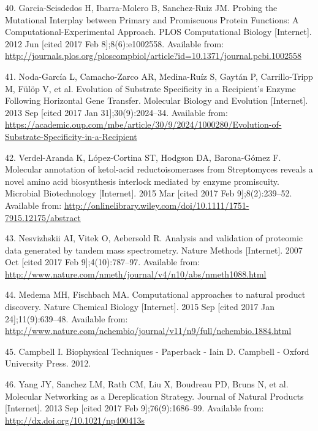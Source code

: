 \documentclass[12pt,twoside]{reedthesis}
\begin{document}
{  \hypertarget{ref-garcia-seisdedos_probing_2012}{}
  40. Garcia-Seisdedos H, Ibarra-Molero B, Sanchez-Ruiz JM. Probing the
  Mutational Interplay between Primary and Promiscuous Protein Functions:
  A Computational-Experimental Approach. PLOS Computational Biology
  {[}Internet{]}. 2012 Jun {[}cited 2017 Feb 8{]};8(6):e1002558. Available
  from:
  \url{http://journals.plos.org/ploscompbiol/article?id=10.1371/journal.pcbi.1002558}
  
  \hypertarget{ref-noda-garcia_evolution_2013}{}
  41. Noda-García L, Camacho-Zarco AR, Medina-Ruíz S, Gaytán P,
  Carrillo-Tripp M, Fülöp V, et al. Evolution of Substrate Specificity in
  a Recipient's Enzyme Following Horizontal Gene Transfer. Molecular
  Biology and Evolution {[}Internet{]}. 2013 Sep {[}cited 2017 Jan
  31{]};30(9):2024--34. Available from:
  \url{https://academic.oup.com/mbe/article/30/9/2024/1000280/Evolution-of-Substrate-Specificity-in-a-Recipient}
  
  \hypertarget{ref-verdel-aranda_molecular_2015}{}
  42. Verdel-Aranda K, López-Cortina ST, Hodgson DA, Barona-Gómez F.
  Molecular annotation of ketol-acid reductoisomerases from Streptomyces
  reveals a novel amino acid biosynthesis interlock mediated by enzyme
  promiscuity. Microbial Biotechnology {[}Internet{]}. 2015 Mar {[}cited
  2017 Feb 9{]};8(2):239--52. Available from:
  \url{http://onlinelibrary.wiley.com/doi/10.1111/1751-7915.12175/abstract}
  
  \hypertarget{ref-nesvizhskii_analysis_2007}{}
  43. Nesvizhskii AI, Vitek O, Aebersold R. Analysis and validation of
  proteomic data generated by tandem mass spectrometry. Nature Methods
  {[}Internet{]}. 2007 Oct {[}cited 2017 Feb 9{]};4(10):787--97. Available
  from:
  \url{http://www.nature.com/nmeth/journal/v4/n10/abs/nmeth1088.html}
  
  \hypertarget{ref-medema_computational_2015}{}
  44. Medema MH, Fischbach MA. Computational approaches to natural product
  discovery. Nature Chemical Biology {[}Internet{]}. 2015 Sep {[}cited
  2017 Jan 24{]};11(9):639--48. Available from:
  \url{http://www.nature.com/nchembio/journal/v11/n9/full/nchembio.1884.html}
  
  \hypertarget{ref-campbell_biophysical_2012}{}
  45. Campbell I. Biophysical Techniques - Paperback - Iain D. Campbell -
  Oxford University Press. 2012.
  
  \hypertarget{ref-yang_molecular_2013}{}
  46. Yang JY, Sanchez LM, Rath CM, Liu X, Boudreau PD, Bruns N, et al.
  Molecular Networking as a Dereplication Strategy. Journal of Natural
  Products {[}Internet{]}. 2013 Sep {[}cited 2017 Feb 9{]};76(9):1686--99.
  Available from: \url{http://dx.doi.org/10.1021/np400413s}
  
}
\end{document}
